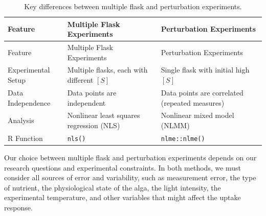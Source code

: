 \documentclass[
  letterpaper,
]{book}
\begin{document}
\begin{longtable}[]{@{}
  >{\raggedright\arraybackslash}p{}
  >{\raggedright\arraybackslash}p{}
  >{\raggedright\arraybackslash}p{}@{}}
\caption{Key differences between multiple flask and perturbation
experiments.}\label{tbl-diffs}\tabularnewline
\toprule\noalign{}
\begin{minipage}[b]{\linewidth}\raggedright
Feature
\end{minipage} & \begin{minipage}[b]{\linewidth}\raggedright
Multiple Flask Experiments
\end{minipage} & \begin{minipage}[b]{\linewidth}\raggedright
Perturbation Experiments
\end{minipage} \\
\midrule\noalign{}
\endfirsthead
\toprule\noalign{}
\begin{minipage}[b]{\linewidth}\raggedright
Feature
\end{minipage} & \begin{minipage}[b]{\linewidth}\raggedright
Multiple Flask Experiments
\end{minipage} & \begin{minipage}[b]{\linewidth}\raggedright
Perturbation Experiments
\end{minipage} \\
\midrule\noalign{}
\endhead
\bottomrule\noalign{}
\endlastfoot
Experimental Setup & Multiple flasks, each with different \([S]\) &
Single flask with initial high \([S]\) \\
Data Independence & Data points are independent & Data points are
correlated (repeated measures) \\
Analysis & Nonlinear least squares regression (NLS) & Nonlinear mixed
model (NLMM) \\
R Function & \texttt{nls()} & \texttt{nlme::nlme()} \\
\end{longtable}

Our choice between multiple flask and perturbation experiments depends
on our research questions and experimental constraints. In both methods,
we must consider all sources of error and variability, such as
measurement error, the type of nutrient, the physiological state of the
alga, the light intensity, the experimental temperature, and other
variables that might affect the uptake response.
\end{document}
